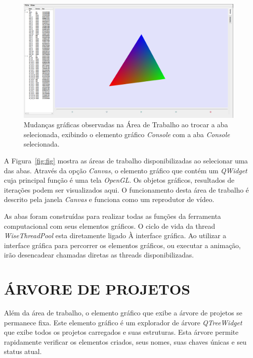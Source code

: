 \begin{figure}
	\centering
	\includegraphics[width=.9\linewidth]{Figures/IGU_001.png}
	\caption{Mudanças gráficas observadas na Área de Trabalho ao trocar a aba selecionada, exibindo o elemento gráfico \textit{Console} com a aba \textit{Console} selecionada.}
	\label{fig:sfig2}
\end{figure}

A Figura~\ref{fig:fig} mostra as áreas de trabalho disponibilizadas ao selecionar uma das abas. Através da opção \textit{Canvas}, o elemento gráfico que contém um \textit{QWidget} cuja principal função é uma tela \textit{OpenGL}. Os objetos gráficos, resultados de iterações podem ser visualizados aqui. O funcionamento desta área de trabalho é descrito pela janela \textit{Canvas} e funciona como um 
reprodutor de vídeo.

As abas foram construídas para realizar todas as funções da ferramenta computacional com seus elementos gráficos. O ciclo de vida da thread \textit{WiseThreadPool} esta diretamente ligado À interface gráfica. Ao utilizar a interface gráfica para percorrer os elementos gráficos, ou executar a animação, irão desencadear chamadas diretas as threads disponibilizadas.

\section{ÁRVORE DE PROJETOS}\label{sec:arvore_projetos}

Além da área de trabalho, o elemento gráfico que exibe a árvore de projetos se permanece fixa. Este elemento gráfico é um explorador de árvore \textit{QTreeWidget} que exibe todos os projetos carregados e suas estruturas. Esta árvore permite rapidamente verificar os elementos criados, seus nomes, suas chaves únicas e seu status atual.

